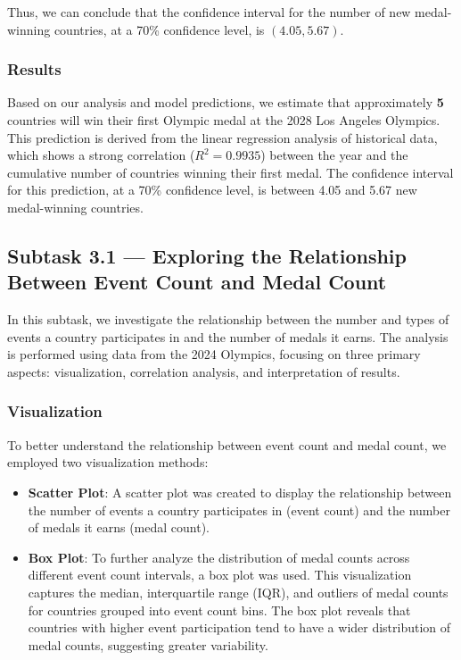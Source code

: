 \documentclass{mcmthesis}
\begin{document}
Thus, we can conclude that the confidence interval for the number of new medal-winning countries, at a 70\% confidence level, is $(4.05, 5.67)$.

\subsubsection{Results}

Based on our analysis and model predictions, we estimate that approximately \textbf{5} countries will win their first Olympic medal at the 2028 Los Angeles Olympics. This prediction is derived from the linear regression analysis of historical data, which shows a strong correlation ($R^2 = 0.9935$) between the year and the cumulative number of countries winning their first medal. The confidence interval for this prediction, at a 70\% confidence level, is between 4.05 and 5.67 new medal-winning countries.


\subsection{Subtask 3.1 --- Exploring the Relationship Between Event Count and Medal Count}

In this subtask, we investigate the relationship between the number and types of events a country participates in and the number of medals it earns. The analysis is performed using data from the 2024 Olympics, focusing on three primary aspects: visualization, correlation analysis, and interpretation of results.

\subsubsection{Visualization}
To better understand the relationship between event count and medal count, we employed two visualization methods:
\begin{itemize}
    \item \textbf{Scatter Plot}: A scatter plot was created to display the relationship between the number of events a country participates in (event count) and the number of medals it earns (medal count).  
    \item \textbf{Box Plot}: To further analyze the distribution of medal counts across different event count intervals, a box plot was used. This visualization captures the median, interquartile range (IQR), and outliers of medal counts for countries grouped into event count bins. The box plot reveals that countries with higher event participation tend to have a wider distribution of medal counts, suggesting greater variability.
\end{itemize}
\end{document}
